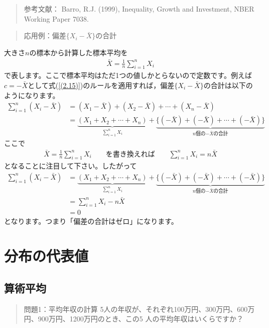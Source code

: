 \documentclass[
]{book}
\theoremstyle{definition}
\theoremstyle{definition}
\theoremstyle{definition}
\theoremstyle{definition}
\theoremstyle{remark}
\begin{document}
\begin{quote}
参考文献：
Barro, R.J. (1999), Inequality, Growth and Investment, NBER Working Paper 7038.
\end{quote}

\begin{quote}
応用例：偏差\(\{ X_i-\bar{X} \}\)の合計
\end{quote}

大きさ\(n\)の標本から計算した標本平均を
\begin{align*}
\bar{X}=\frac{1}{n} \sum_{i=1}^n X_i
\end{align*}
で表します。ここで標本平均はただ1つの値しかとらないので定数です。例えば\(c=-\bar{X}\)として式(\ref{(2.15)})のルールを適用すれば，偏差\(\{ X_i-\bar{X} \}\)の合計は以下のようになります。
\begin{align*}
\sum_{i=1}^n (X_i-\bar{X})
&=(X_1-\bar{X})+(X_2-\bar{X})+\cdots+(X_n-\bar{X}) \\
&=\underbrace{(X_1+X_2+\cdots+X_n)}_{\sum_{i=1}^n X_i}
+\underbrace{\{ (-\bar{X})+(-\bar{X})+\cdots+(-\bar{X}) \}}_{\text{$n$個の$-\bar{X}$の合計}}
\end{align*}
ここで
\begin{align*}
\bar{X}=\frac{1}{n}\sum_{i=1}^n X_i
\qquad \text{を書き換えれば} \qquad
\sum_{i=1}^n X_i=n \bar{X}
\end{align*}
となることに注目して下さい。したがって
\begin{align*}
\sum_{i=1}^n (X_i-\bar{X})
&=\underbrace{(X_1+X_2+\cdots+X_n)}_{\sum_{i=1}^n X_i}
+\underbrace{\{ (-\bar{X})+(-\bar{X})+\cdots+(-\bar{X}) \}}_{\text{$n$個の$-\bar{X}$の合計}} \\
&=\sum_{i=1}^n X_i-n \bar{X} \\
&=0
\end{align*}
となります。つまり「偏差の合計はゼロ」になります。

\hypertarget{ux5206ux5e03ux306eux4ee3ux8868ux5024}{%
\chapter{分布の代表値}\label{ux5206ux5e03ux306eux4ee3ux8868ux5024}}

\hypertarget{ux7b97ux8853ux5e73ux5747}{%
\section{算術平均}\label{ux7b97ux8853ux5e73ux5747}}

\begin{quote}
問題1：平均年収の計算
5人の年収が、それぞれ100万円、300万円、600万円、900万円、1200万円のとき、この5 人の平均年収はいくらですか？
\end{quote}
\end{document}

